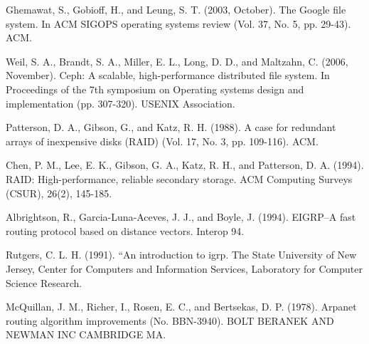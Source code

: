 \documentclass[12pt]{article}
\begin{document}
\begin{thebibliography}{99}
    Ghemawat, S., Gobioff, H., and Leung, S. T. (2003, October). The Google file system. In ACM SIGOPS operating systems review (Vol. 37, No.  5, pp. 29-43). ACM.

    Weil, S. A., Brandt, S. A., Miller, E. L., Long, D. D., and Maltzahn, C. (2006, November). Ceph: A scalable, high-performance distributed file system. In Proceedings of the 7th symposium on Operating systems design and implementation (pp. 307-320). USENIX Association.

    Patterson, D. A., Gibson, G., and Katz, R. H. (1988). A case for redundant arrays of inexpensive disks (RAID) (Vol. 17, No. 3, pp.  109-116). ACM.

    Chen, P. M., Lee, E. K., Gibson, G. A., Katz, R. H., and Patterson, D. A. (1994). RAID: High-performance, reliable secondary storage. ACM Computing Surveys (CSUR), 26(2), 145-185.

    Albrightson, R., Garcia-Luna-Aceves, J. J., and Boyle, J.  (1994). EIGRP--A fast routing protocol based on distance vectors. Interop 94.

    Rutgers, C. L. H. (1991). “An introduction to igrp. The State University of New Jersey, Center for Computers and Information Services, Laboratory for Computer Science Research.

    McQuillan, J. M., Richer, I., Rosen, E. C., and Bertsekas, D. P. (1978). Arpanet routing algorithm improvements (No. BBN-3940). BOLT BERANEK AND NEWMAN INC CAMBRIDGE MA.

 \end{thebibliography}
\end{document}
